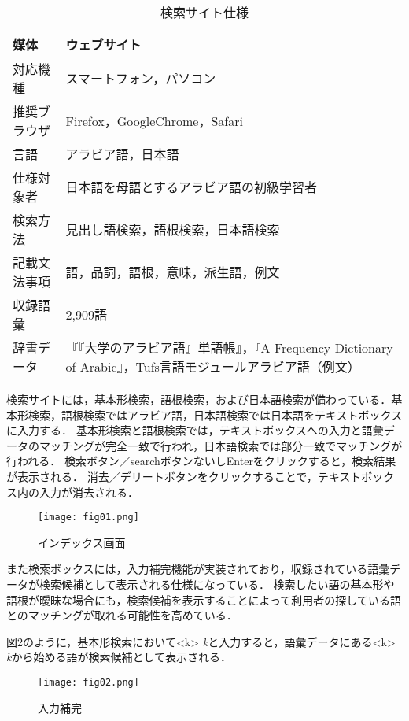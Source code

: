 \documentclass[technicalreport]{ieicej}
\begin{document}
\begin{table}[ht]
\begin{center}
\begin{tabular}{l|p{6 cm}}
   媒体 & ウェブサイト\\
  \hline
    対応機種 & スマートフォン，パソコン\\
    推奨ブラウザ & Firefox，GoogleChrome，Safari\\
    言語 &  アラビア語，日本語\\
    仕様対象者 &  日本語を母語とするアラビア語の初級学習者\\
    検索方法 &  見出し語検索，語根検索，日本語検索\\
    記載文法事項 &  語，品詞，語根，意味，派生語，例文\\
    収録語彙 &  2,909語\\
    辞書データ &  『『大学のアラビア語』単語帳』，『A Frequency Dictionary of Arabic』，Tufs言語モジュールアラビア語（例文）\\
\hline
\end{tabular}
\caption{検索サイト仕様}
\label{table:website}
\end{center}
\end{table}

検索サイトには，基本形検索，語根検索，および日本語検索が備わっている．基本形検索，語根検索ではアラビア語，日本語検索では日本語をテキストボックスに入力する．
基本形検索と語根検索では，テキストボックスへの入力と語彙データのマッチングが完全一致で行われ，日本語検索では部分一致でマッチングが行われる．
検索ボタン／searchボタンないしEnterをクリックすると，検索結果が表示される．
消去／デリートボタンをクリックすることで，テキストボックス内の入力が消去される．

\begin{figure}[H]
\begin{center}
\texttt{[image: fig01.png]}
\caption{インデックス画面}
\end{center}
\end{figure}

また検索ボックスには，入力補完機能が実装されており，収録されている語彙データが検索候補として表示される仕様になっている．
検索したい語の基本形や語根が曖昧な場合にも，検索候補を表示することによって利用者の探している語とのマッチングが取れる可能性を高めている．

図2のように，基本形検索において<k> \textit{k}と入力すると，語彙データにある<k> \textit{k}から始める語が検索候補として表示される．

\begin{figure}[H]
\begin{center}
\texttt{[image: fig02.png]}
\caption{入力補完}
\end{center}
\end{figure}
\end{document}
